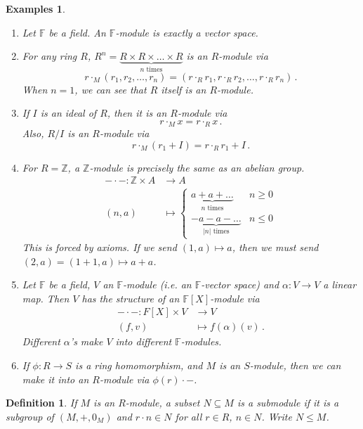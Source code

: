\documentclass{article}
\theoremstyle{plain}\theoremheaderfont{\normalfont\itshape}\theorembodyfont{\rmfamily}\theoremseparator{.}\newtheorem*{rem}{Remark}\newtheorem*{ex}{Example}\newtheorem*{proof}{Proof}\newtheorem*{altp}{Alternative proof}\newtheorem*{nonex}{Non-Example}
\theoremstyle{plain}\theoremheaderfont{\normalfont\bfseries}\theorembodyfont{\rmfamily}\theoremseparator{.}\newtheorem{thm}{Theorem}[section]\newtheorem{lem}[thm]{Lemma}\newtheorem{prop}[thm]{Proposition}\newtheorem*{cor}{Corollary}\newtheorem{defn}[thm]{Definition}\newtheorem{clm}[thm]{Claim}\newtheorem{clminproof}{Claim}\newtheorem*{notn}{Notation}\newtheorem*{exer}{Exercise}\newtheorem*{lemnn}{Lemma}
\theoremstyle{break}\theoremheaderfont{\normalfont\itshape}\theorembodyfont{\rmfamily}\theoremseparator{.\medskip}\newtheorem*{proofskip}{Proof}\newtheorem*{exs}{Examples}\newtheorem*{rems}{Remarks}\newtheorem*{obs}{Observations}
\theoremstyle{break}\theoremheaderfont{\normalfont\bfseries}\theorembodyfont{\rmfamily}\theoremseparator{.\medskip}\newtheorem{lemskip}[thm]{Lemma}\newtheorem{defnskip}[thm]{Definition}\newtheorem{propskip}[thm]{Proposition}\newtheorem{thmskip}[thm]{Theorem}
\numberwithin{equation}{section}
\newcommand{\abs}[1]{\left|#1\right|}
\newcommand{\ZZ}{\mathbb{Z}}
\newcommand{\FF}{\mathbb{F}}
\begin{document}
    \begin{exs}
        \begin{enumerate}[topsep=0pt,label=(\roman*)]
            \item Let \(\FF\) be a field. An \(\FF\)-module is exactly a vector space.
            \item For any ring \(R\), \(R^n=\underbrace{R\times R\times\dots\times R}_{n\text{ times}}\) is an \(R\)-module via
            \[r\cdot_M(r_1,r_2,\dots,r_n)=(r\cdot_R r_1,r\cdot_R r_2,\dots, r\cdot_R r_n)\,.\]
            When \(n=1\), we can see that \(R\) itself is an \(R\)-module.
            \item If \(I\) is an ideal of \(R\), then it is an \(R\)-module via
            \[r\cdot_M x=r\cdot_R x\,.\]
            Also, \(R/I\) is an \(R\)-module via
            \[r\cdot_M(r_1+I)=r\cdot_R r_1+I\,.\]
            \item For \(R=\ZZ\), a \(\ZZ\)-module is precisely the same as an abelian group.
            \begin{align*}
                -\cdot -:\ZZ\times A&\longrightarrow A\\
                (n,a)&\longmapsto\begin{cases}
                    \underbrace{a+a+\dots}_{n\text{ times}} & n\ge 0\\
                    \underbrace{-a-a-\dots}_{\abs{n}\text{ times}} & n\le 0
                \end{cases}
            \end{align*}
            This is forced by axioms. If we send \((1,a)\mapsto a\), then we must send \((2,a)=(1+1,a)\mapsto a+a\).
            \item Let \(\FF\) be a field, \(V\) an \(\FF\)-module (i.e. an \(\FF\)-vector space) and \(\alpha:V\to V\) a linear map. Then \(V\) has the structure of an \(\FF[X]\)-module via
            \begin{align*}
                -\cdot -:F[X]\times V&\longrightarrow V\\
                (f,v)&\longmapsto f(\alpha)(v)\,.
            \end{align*}
            Different \(\alpha\)'s make \(V\) into different \(\FF\)-modules.
            \item If \(\phi:R\to S\) is a ring homomorphism, and \(M\) is an \(S\)-module, then we can make it into an \(R\)-module via \(\phi(r)\cdot -\).
        \end{enumerate}
    \end{exs}
    \begin{defn}
        If \(M\) is an \(R\)-module, a subset \(N\subseteq M\) is a \textit{submodule} if it is a subgroup of \((M,+,0_M)\) and \(r\cdot n\in N\) for all \(r\in R\), \(n\in N\). Write \(N\le M\).
    \end{defn}
\end{document}
